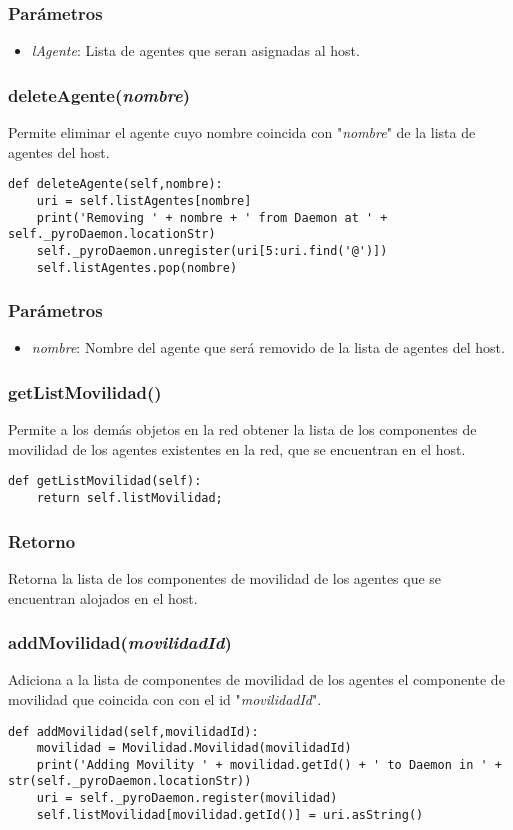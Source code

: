 \documentclass{article}
\begin{document}
\subsubsection*{Parámetros}
\begin{itemize}
\item \textit{lAgente}: Lista de agentes que seran asignadas al host.
\end{itemize}
\subsubsection{\textbf{deleteAgente}(\textit{nombre})}
Permite eliminar el agente cuyo nombre coincida con "\textit{nombre}" de la lista de agentes del host.
\begin{lstlisting}
def deleteAgente(self,nombre):
	uri = self.listAgentes[nombre]
    print('Removing ' + nombre + ' from Daemon at ' + self._pyroDaemon.locationStr)
	self._pyroDaemon.unregister(uri[5:uri.find('@')])
    self.listAgentes.pop(nombre)
\end{lstlisting}
\subsubsection*{Parámetros}
\begin{itemize}
\item \textit{nombre}: Nombre del agente que será removido de la lista de agentes del host.
\end{itemize}
\subsubsection{\textbf{getListMovilidad}()}
Permite a los demás objetos en la red obtener la lista de los componentes de movilidad de los agentes existentes en la red, que se encuentran en el host.
\begin{lstlisting}
def getListMovilidad(self):
	return self.listMovilidad;
\end{lstlisting}
\subsubsection*{Retorno}
Retorna la lista de los componentes de movilidad de los agentes que se encuentran alojados en el host.
\subsubsection{\textbf{addMovilidad}(\textit{movilidadId})}
Adiciona a la lista de componentes de movilidad de los agentes el componente de movilidad que coincida con con el id "\textit{movilidadId}".
\begin{lstlisting}
def addMovilidad(self,movilidadId): 
	movilidad = Movilidad.Movilidad(movilidadId)
	print('Adding Movility ' + movilidad.getId() + ' to Daemon in ' + str(self._pyroDaemon.locationStr))
	uri = self._pyroDaemon.register(movilidad)
	self.listMovilidad[movilidad.getId()] = uri.asString()
\end{lstlisting}
\end{document}
